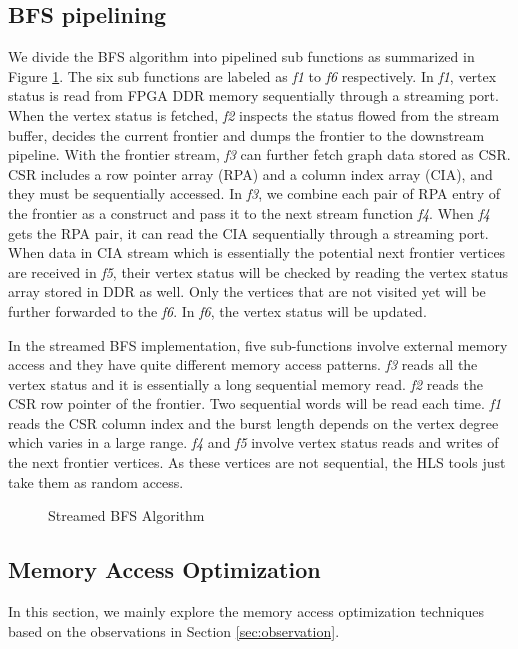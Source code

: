 \subsection{BFS pipelining}
We divide the BFS algorithm into pipelined 
sub functions as summarized in Figure \ref{fig:bfs-stream}. 
The six sub functions are labeled as \textit{f1} to \textit{f6} respectively. In \textit{f1}, 
vertex status is read from FPGA DDR memory sequentially through a streaming port. 
When the vertex status is fetched, \textit{f2} inspects the status 
flowed from the stream buffer, decides the current frontier 
and dumps the frontier to the downstream pipeline. 
With the frontier stream, \textit{f3} can further fetch graph 
data stored as CSR. CSR includes a row pointer array (RPA) 
and a column index array (CIA), and they must be sequentially accessed. 
In \textit{f3}, we combine each pair of RPA entry of the frontier as a construct 
and pass it to the next stream function \textit{f4}. When \textit{f4} gets the RPA pair, 
it can read the CIA sequentially through a streaming port. 
When data in CIA stream which is essentially the potential 
next frontier vertices are received in \textit{f5}, their vertex status 
will be checked by reading the vertex status array stored in DDR as well.
Only the vertices that are not visited yet will be further forwarded to the \textit{f6}. 
In \textit{f6}, the vertex status will be updated.

In the streamed BFS implementation, five sub-functions involve external memory access 
and they have quite different memory access patterns. \textit{f3} reads all the vertex 
status and it is essentially a long sequential memory read. \textit{f2} reads the CSR 
row pointer of the frontier. Two sequential words will be read each time. 
\textit{f1} reads the CSR column index and the 
burst length depends on the vertex degree which varies in a large range. 
\textit{f4} and \textit{f5} involve vertex status reads and writes of the next frontier vertices.
As these vertices are not sequential, the HLS tools just take them as random access. 

\begin{figure}
	\caption{Streamed BFS Algorithm}
	\label{fig:bfs-stream}
	\vspace{-1.5em}
\end{figure}

\subsection{Memory Access Optimization}
In this section, we mainly explore the memory 
access optimization techniques based on the observations 
in Section \ref{sec:observation}.

